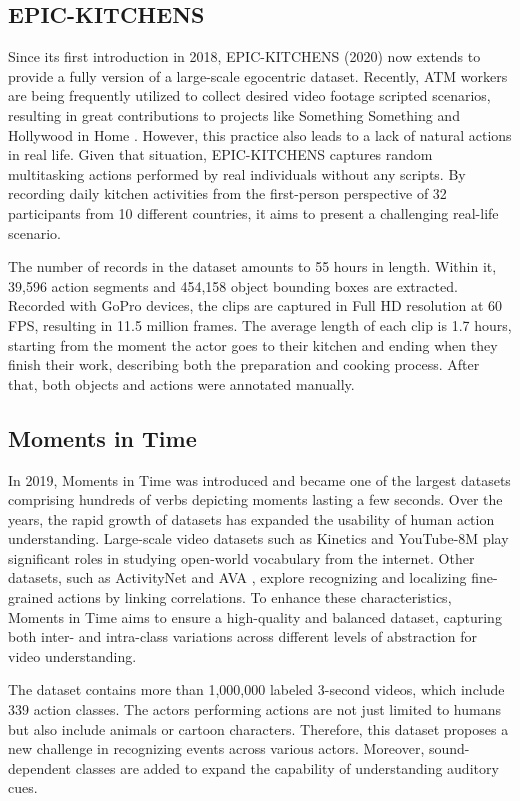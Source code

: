 \documentclass[a4paper]{article}
\begin{document}
\subsection{EPIC-KITCHENS}
Since its first introduction in 2018, EPIC-KITCHENS (2020) now extends to provide a fully version of a large-scale egocentric dataset. Recently, ATM workers are being frequently utilized to collect desired video footage scripted scenarios, resulting in great contributions to projects like Something Something \cite{somethingsomething} and Hollywood in Home \cite{Charades}. However, this practice also leads to a lack of natural actions in real life. Given that situation, EPIC-KITCHENS captures random multitasking actions performed by real individuals without any scripts. By recording daily kitchen activities from the first-person perspective of 32 participants from 10 different countries, it aims to present a challenging real-life scenario.

The number of records in the dataset amounts to 55 hours in length. Within it, 39,596 action segments and 454,158 object bounding boxes are extracted. Recorded with GoPro devices, the clips are captured in Full HD resolution at 60 FPS, resulting in 11.5 million frames. The average length of each clip is 1.7 hours, starting from the moment the actor goes to their kitchen and ending when they finish their work, describing both the preparation and cooking process. After that, both objects and actions were annotated manually.

\subsection{Moments in Time}
In 2019, Moments in Time \cite{momentsintime} was introduced and became one of the largest datasets comprising hundreds of verbs depicting moments lasting a few seconds. Over the years, the rapid growth of datasets has expanded the usability of human action understanding. Large-scale video datasets such as Kinetics and YouTube-8M \cite{YouTube8M} play significant roles in studying open-world vocabulary from the internet. Other datasets, such as ActivityNet \cite{ActivityNet} and AVA \cite{AVA}, explore recognizing and localizing fine-grained actions by linking correlations. To enhance these characteristics, Moments in Time aims to ensure a high-quality and balanced dataset, capturing both inter- and intra-class variations across different levels of abstraction for video understanding.

The dataset contains more than 1,000,000 labeled 3-second videos, which include 339 action classes. The actors performing actions are not just limited to humans but also include animals or cartoon characters. Therefore, this dataset proposes a new challenge in recognizing events across various actors. Moreover, sound-dependent classes are added to expand the capability of understanding auditory cues.
\end{document}
